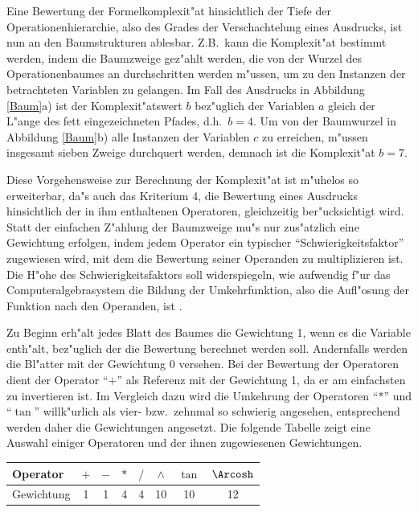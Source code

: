 Eine Bewertung der Formelkomplexit"at hinsichtlich der Tiefe der
Operationenhierarchie, also des Grades der Verschachtelung eines
Ausdrucks, ist nun an den Baumstrukturen ablesbar. Z.B.\ kann die
Komplexit"at bestimmt werden, indem die Baumzweige gez"ahlt werden, die von
der Wurzel des Operationenbaumes an durchschritten werden m"ussen, um zu
den Instanzen der betrachteten Variablen zu gelangen. Im Fall des
Ausdrucks in Abbildung \ref{Baum}a) ist der Komplexit"atswert $b$
bez"uglich der Variablen $a$ gleich der L"ange des fett eingezeichneten
Pfades, d.h.\ $b = 4$. Um von der Baumwurzel in Abbildung \ref{Baum}b)
alle Instanzen der Variablen $c$ zu erreichen, m"ussen insgesamt sieben
Zweige durchquert werden, demnach ist die Komplexit"at $b=7$.

Diese Vorgehensweise zur Berechnung der Komplexit"at ist m"uhelos so 
erweiterbar, da"s auch das Kriterium 4, die Bewertung eines Ausdrucks 
hinsichtlich der in ihm enthaltenen Operatoren, gleichzeitig
ber"ucksichtigt wird. Statt der einfachen Z"ahlung der Baumzweige mu"s
nur zus"atzlich eine Gewichtung erfolgen, indem jedem Operator ein 
typischer ``Schwierigkeitsfaktor'' zugewiesen wird, mit dem die 
Bewertung seiner Operanden zu multiplizieren ist. Die H"ohe des 
Schwierigkeitsfaktors soll widerspiegeln, wie aufwendig f"ur das 
Computeralgebrasystem die Bildung der Umkehrfunktion, also die 
Aufl"osung der Funktion nach den Operanden, ist \cite{Trispel}. 

Zu Beginn erh"alt jedes Blatt des Baumes die Gewichtung 1, wenn es die
Variable enth"alt, bez"uglich der die Bewertung berechnet werden soll.
Andernfalls werden die Bl"atter mit der Gewichtung 0 versehen. Bei der
Bewertung der Operatoren dient der Operator ``$+$'' als Referenz mit der
Gewichtung 1, da er am einfachsten zu invertieren ist. Im Vergleich
dazu wird die Umkehrung der Operatoren ``$*$'' und ``$\tan$''
willk"urlich als vier- bzw.\ zehnmal so schwierig angesehen, entsprechend 
werden daher die Gewichtungen angesetzt. Die folgende Tabelle zeigt eine 
Auswahl einiger Operatoren und der ihnen zugewiesenen Gewichtungen.

\begin{center}
\begin{tabular}{|l|*{7}{c|}}
\hline
Operator   & $+$ & $-$ & $*$ & $/$ & $\wedge$ & $\tan$ & $\Arcosh$ \\
\hline
Gewichtung &  1  &  1  &  4  &  4  &    10    &   10   &     12    \\
\hline
\end{tabular}
\end{center}

